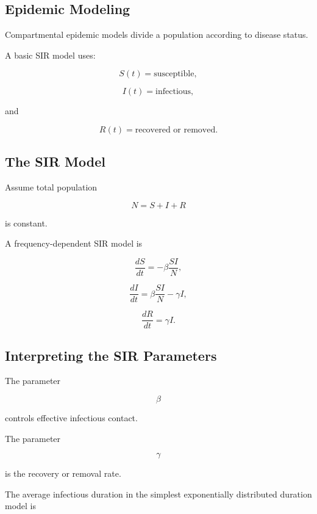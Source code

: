 \subsection{Epidemic Modeling}
\label{subsec:epidemic-modeling}

Compartmental epidemic models divide a population according to disease
status.

A basic SIR model uses:

\[
\boxed{
S(t)
=
\text{susceptible},
}
\]

\[
\boxed{
I(t)
=
\text{infectious},
}
\]

and

\[
\boxed{
R(t)
=
\text{recovered or removed}.
}
\]

\subsection{The SIR Model}
\label{subsec:sir-model}

Assume total population

\[
N=S+I+R
\]

is constant.

A frequency-dependent SIR model is

\[
\boxed{
\frac{dS}{dt}
=
-\beta
\frac{SI}{N},
}
\]

\[
\boxed{
\frac{dI}{dt}
=
\beta
\frac{SI}{N}
-
\gamma I,
}
\]

\[
\boxed{
\frac{dR}{dt}
=
\gamma I.
}
\]

\subsection{Interpreting the SIR Parameters}
\label{subsec:sir-parameters}

The parameter

\[
\beta
\]

controls effective infectious contact.

The parameter

\[
\gamma
\]

is the recovery or removal rate.

The average infectious duration in the simplest exponentially distributed
duration model is

